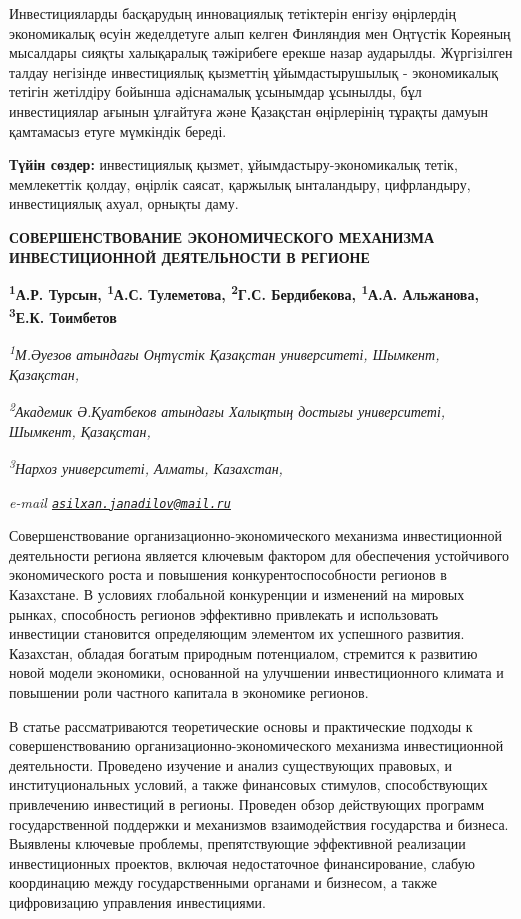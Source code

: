 Инвестицияларды басқарудың инновациялық тетіктерін енгізу өңірлердің
экономикалық өсуін жеделдетуге алып келген Финляндия мен Оңтүстік
Кореяның мысалдары сияқты халықаралық тәжірибеге ерекше назар аударылды.
Жүргізілген талдау негізінде инвестициялық қызметтің
ұйымдастырушылық - экономикалық тетігін жетілдіру бойынша әдіснамалық
ұсынымдар ұсынылды, бұл инвестициялар ағынын ұлғайтуға және Қазақстан
өңірлерінің тұрақты дамуын қамтамасыз етуге мүмкіндік береді.

{\bfseries Түйін сөздер:} инвестициялық қызмет, ұйымдастыру-экономикалық
тетік, мемлекеттік қолдау, өңірлік саясат, қаржылық ынталандыру,
цифрландыру, инвестициялық ахуал, орнықты даму.

\begin{articleheader}
{\bfseries СОВЕРШЕНСТВОВАНИЕ ЭКОНОМИЧЕСКОГО МЕХАНИЗМА ИНВЕСТИЦИОННОЙ ДЕЯТЕЛЬНОСТИ В РЕГИОНЕ}

{\bfseries
\textsuperscript{1}А.Р. Турсын\textsuperscript{\envelope },
\textsuperscript{1}А.С. Тулеметова,
\textsuperscript{2}Г.С. Бердибекова,
\textsuperscript{1}А.А. Альжанова,
\textsuperscript{3}Е.К. Тоимбетов}
\end{articleheader}

\begin{affiliation}
\emph{\textsuperscript{1}М.Әуезов атындағы Оңтүстік Қазақстан университеті, Шымкент, Қазақстан,}

\emph{\textsuperscript{2}Академик Ә.Қуатбеков атындағы Халықтың достығы университеті, Шымкент, Қазақстан,}

\emph{\textsuperscript{3}Нархоз университеті, Алматы, Казахстан,}

\emph{e-mail \href{mailto:asilxan.janadilov@mail.ru}{\nolinkurl{asilxan.janadilov@mail.ru}}}
\end{affiliation}

Совершенствование организационно-экономического механизма инвестиционной
деятельности региона является ключевым фактором для обеспечения
устойчивого экономического роста и повышения конкурентоспособности
регионов в Казахстане. В условиях глобальной конкуренции и изменений на
мировых рынках, способность регионов эффективно привлекать и
использовать инвестиции становится определяющим элементом их успешного
развития. Казахстан, обладая богатым природным потенциалом, стремится к
развитию новой модели экономики, основанной на улучшении инвестиционного
климата и повышении роли частного капитала в экономике регионов.

В статье рассматриваются теоретические основы и практические подходы к
совершенствованию организационно-экономического механизма инвестиционной
деятельности. Проведено изучение и анализ существующих правовых, и
институциональных условий, а также финансовых стимулов, способствующих
привлечению инвестиций в регионы. Проведен обзор действующих программ
государственной поддержки и механизмов взаимодействия государства и
бизнеса. Выявлены ключевые проблемы, препятствующие эффективной
реализации инвестиционных проектов, включая недостаточное
финансирование, слабую координацию между государственными органами и
бизнесом, а также цифровизацию управления инвестициями.

